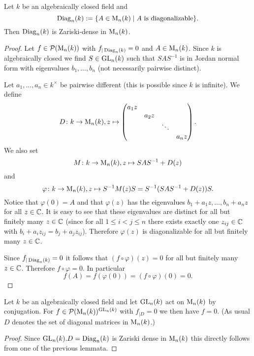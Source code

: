 \begin{prop}
 Let $k$ be an algebraically closed field and
 \[
  \operatorname{Diag}_n(k) := \{A \in \operatorname{M}_n(k) \mid \text{$A$ is diagonalizable}\}.
 \]
 Then $\operatorname{Diag}_n(k)$ is Zariski-dense in $\operatorname{M}_n(k)$.
\end{prop}
\begin{proof}
 Let $f \in \mathcal{P}(\operatorname{M}_n(k))$ with $f_{|\operatorname{Diag}_n(k)} = 0$ and $A \in \operatorname{M}_n(k)$. Since $k$ is algebraically closed we find $S \in \operatorname{GL}_n(k)$ such that $SAS^{-1}$ is in Jordan normal form with eigenvalues $b_1, \dotsc, b_n$ (not necessarily pairwise distinct).
 
 Let $a_1, \dotsc, a_n \in k^\times$ be pairwise different (this is possible since $k$ is infinite). We define
 \[
  D \colon k \to \operatorname{M}_n(k), z \mapsto
  \begin{pmatrix}
   a_1 z &       &        &       \\
         & a_2 z &        &       \\
         &       & \ddots &       \\
         &       &        & a_n z
  \end{pmatrix}.
 \]
 We also set
 \[
  M \colon k \to \operatorname{M}_n(k), z \mapsto SAS^{-1} + D(z)
 \]
 and
 \[
  \varphi \colon k \to \operatorname{M}_n(k), z \mapsto S^{-1} M(z) S = S^{-1}(SAS^{-1}+D(z))S.
 \]
 Notice that $\varphi(0) = A$ and that $\varphi(z)$ has the eigenvalues $b_1 + a_1 z, \dotsc, b_n + a_n z$ for all $z \in \mathbb{C}$. It is easy to see that these eigenvalues are distinct for all but finitely many $z \in \mathbb{C}$ (since for all $1 \leq i < j \leq n$ there exists exactly one $z_{ij} \in \mathbb{C}$ with $b_i + a_i z_{ij} = b_j + a_j z_{ij}$). Therefore $\varphi(z)$ is diagonalizable for all but finitely many $z \in \mathbb{C}$.
 
 Since $f_{|\operatorname{Diag}_n(k)} = 0$ it follows that $(f \circ \varphi)(z) = 0$ for all but finitely many $z \in \mathbb{C}$. Therefore $f \circ \varphi = 0$. In particular
 \[
  f(A) = f(\varphi(0)) = (f \circ \varphi)(0) = 0.
 \]
\end{proof}


\begin{cor}
 Let $k$ be an algebraically closed field and let $\operatorname{GL}_n(k)$ act on $\operatorname{M}_n(k)$ by conjugation. For $f \in \mathcal{P}(\operatorname{M}_n(k))^{\operatorname{GL}_n(k)}$ with $f_{|D} = 0$ we then have $f = 0$. (As usual $D$ denotes the set of diagonal matrices in $\operatorname{M}_n(k)$.)
\end{cor}
\begin{proof}
 Since $\operatorname{GL}_n(k).D = \operatorname{Diag}_n(k)$ is Zariski dense in $\operatorname{M}_n(k)$ this directly follows from one of the previous lemmata.
\end{proof}































